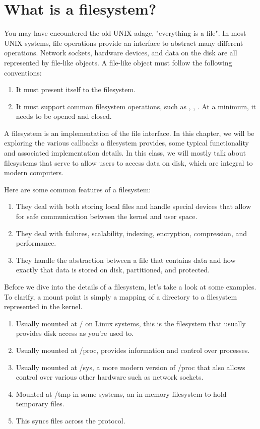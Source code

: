 \section{What is a filesystem?}

You may have encountered the old UNIX adage, "everything is a file".
In most UNIX systems, file operations provide an interface to abstract many different operations.
Network sockets, hardware devices, and data on the disk are all represented by file-like objects.
A file-like object must follow the following conventions:

\begin{enumerate}
  \item It must present itself to the filesystem.
  \item It must support common filesystem operations, such as , , .
        At a minimum, it needs to be opened and closed.
\end{enumerate}

A filesystem is an implementation of the file interface.
In this chapter, we will be exploring the various callbacks a filesystem provides, some typical functionality and associated implementation details.
In this class, we will mostly talk about filesystems that serve to allow users to access data on disk, which are integral to modern computers.

Here are some common features of a filesystem:

\begin{enumerate}
    \item They deal with both storing local files and handle special devices that allow for safe communication between the kernel and user space.
    \item They deal with failures, scalability, indexing, encryption, compression, and performance.
    \item They handle the abstraction between a file that contains data and how exactly that data is stored on disk, partitioned, and protected.
\end{enumerate}

Before we dive into the details of a filesystem, let's take a look at some examples.
To clarify, a mount point is simply a mapping of a directory to a filesystem represented in the kernel.

\begin{enumerate}
  \item {} Usually mounted at / on Linux systems, this is the filesystem that usually provides disk access as you're used to.
  \item {} Usually mounted at /proc, provides information and control over processes.
  \item {} Usually mounted at /sys, a more modern version of /proc that also allows control over various other hardware such as network sockets.
  \item {} Mounted at /tmp in some systems, an in-memory filesystem to hold temporary files.
  \item {} This syncs files across the  protocol.
\end{enumerate}

